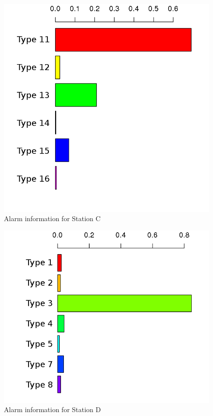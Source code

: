 \begin{figure}[htb]
 \centering
 \includegraphics[width=\textwidth]{./img/segovia_graph.png}
 \caption{Alarm information for Station C}
 \label{fig:segovia_chart}
\end{figure}
\begin{figure}[htb]
 \centering
 \includegraphics[width=\textwidth]{./img/sevilla_graph.png}
 \caption{Alarm information for Station D}
 \label{fig:sevilla_chart}
\end{figure}

